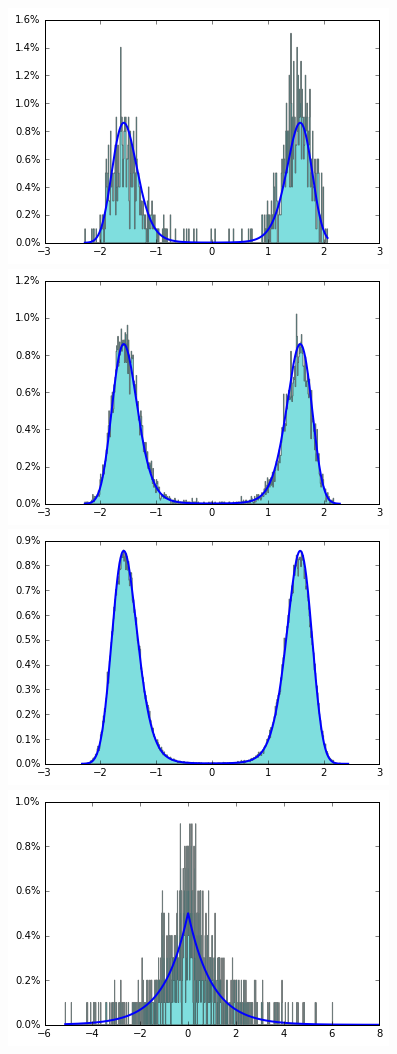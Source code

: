 \documentclass[final]{beamer}
\newlength{\onecolwid}
\begin{document}
\begin{frame}[t]
\begin{columns}[t]
\begin{column}{\onecolwid}
\begin{figure}
    \includegraphics[width=.3\onecolwid]{../figure/case2_step_0.005_iter_1e3.png}
    \includegraphics[width=.3\onecolwid]{../figure/case2_step_0.005_iter_1e4.png}
    \includegraphics[width=.3\onecolwid]{../figure/case2_step_0.005_iter_1e5.png}\\
    \includegraphics[width=.3\onecolwid]{../figure/case3_step_0.005_iter_1e3.png}

\end{figure}
\end{column}
\end{columns}
\end{frame}
\end{document}
